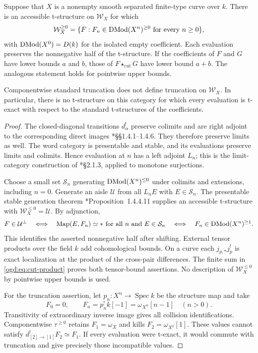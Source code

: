 \begin{proposition}\label{ogd:prop:word-t-structure}
Suppose that $X$ is a nonempty smooth separated finite-type curve over $k$.
There is an accessible t-structure on $\mathcal W_X$ for which
\[
 \mathcal W_X^{\geq0}
 =\{F:F_n\in\operatorname{DMod}(X^n)^{\geq0}\text{ for every }n\geq0\},
\]
with $\operatorname{DMod}(X^0)=D(k)$ for the isolated empty coefficient.
Each evaluation preserves the nonnegative half of the t-structure.
If the coefficients of $F$ and $G$ have lower bounds $a$ and $b$,
those of $F\star_{\mathrm{cut}}G$ have lower bound $a+b$.
The analogous statement holds for pointwise upper bounds.

Componentwise standard truncation does not define truncation on
$\mathcal W_X$. In particular, there is no t-structure on this
category for which every evaluation is t-exact with respect to
the standard t-structures of the coefficients.
\end{proposition}

\begin{proof}
The closed-diagonal transitions $d_\alpha^!$ preserve colimits and
are right adjoint to the corresponding direct images
\cite{chhop:FG}*{\S\S1.4.1--1.4.6}.
They therefore preserve limits as well. The word category is
presentable and stable, and its evaluations preserve limits and
colimits. Hence evaluation at $n$ has a left adjoint $L_n$;
this is the limit-category construction of
\cite{chhop:FG}*{\S2.1.3}, applied to monotone surjections.

Choose a small set $\mathcal S_n$ generating
$\operatorname{DMod}(X^n)^{\leq0}$ under colimits and extensions, including
$n=0$. Generate an aisle $\mathcal U$ from all $L_nE$ with
$E\in\mathcal S_n$. The presentable stable generation theorem
\cite{cke:Lurie}*{Proposition~1.4.4.11} supplies an accessible
t-structure with $\mathcal W_X^{\leq0}=\mathcal U$.
By adjunction,
\[
 F\in\mathcal U^\perp
 \quad\Longleftrightarrow\quad
 \operatorname{Map}(E,F_n)\simeq *
 \ \text{for all }n\text{ and }E\in\mathcal S_n
 \quad\Longleftrightarrow\quad F_n\in\operatorname{DMod}(X^n)^{\geq1}.
\]
This identifies the asserted nonnegative half after shifting.
External tensor products over the field $k$ add cohomological
bounds. On a curve each $j_{p,*}j_p^!$ is exact localization at
the product of the cross-pair differences. The finite sum in
\eqref{ogd:eq:cut-product} proves both tensor-bound assertions.
No description of $\mathcal W_X^{\leq0}$ by pointwise upper
bounds is used.

For the truncation assertion, let $p_n:X^n\to\operatorname{Spec}k$
be the structure map and take
\[
 F_0=0,\qquad F_n=p_n^!k[-1]=\omega_{X^n}[n-1]\quad(n>0).
\]
Transitivity of extraordinary inverse image gives all collision
identifications. Componentwise $\tau^{\geq0}$ retains
$F_1=\omega_X$ and kills $F_2=\omega_{X^2}[1]$.
These values cannot satisfy $d_{[2]\to[1]}^!F_2\simeq F_1$.
If every evaluation were t-exact, it would commute with
truncation and give precisely those incompatible values.
\end{proof}


